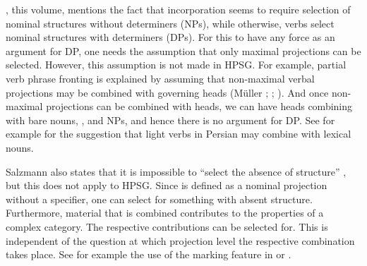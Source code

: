 \documentclass[output=paper
  ,nobabel
  ,draftmode
  ,uniformtopskip %
  ,colorlinks, citecolor=brown
]{langscibook}
\begin{document}

\enlargethispage{5pt}
\citet[Section~\ref{salzmann:sec-categorial-selection}]{chapters/salzmann}, this volume, mentions the fact that incorporation seems to
require selection of nominal structures without determiners (NPs), while otherwise, verbs select
nominal structures with determiners (DPs). For this to have any force as an argument for DP, one
needs the assumption that only maximal projections can be selected. However, this assumption is not
made in HPSG. For example, partial verb phrase fronting is explained by assuming that non-maximal
verbal projections may be combined with governing heads (Müller \citeyear{Mueller96a};
\citeyear[Section~2.2.2]{Mueller2002b}; \citealp{Meurers99a}). And once non-maximal projections can
be combined with heads, we can have heads combining with bare nouns, \nbars, and NPs, and hence
there is no argument for DP. See for example \citet[]{MuellerPersian} for the suggestion
that light verbs in Persian may combine with lexical nouns.

Salzmann also states that it is impossible to ``select the absence of structure'' \parencites[28, 32]{Salzmann2020a}[Section~\ref{salzmann:sec-agreement}]{chapters/salzmann}, but this does not apply to HPSG. Since \nbar is defined as a nominal projection without a
specifier, one can select for something with absent structure. Furthermore, material that is
combined contributes to the properties of a complex category. The respective contributions can be
selected for. This is independent of the question at which projection level the respective
combination takes place. See for example the use of the marking feature in  or . 



\end{document}
